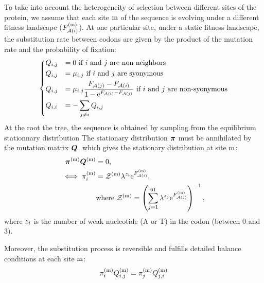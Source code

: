 To take into account the heterogeneity of selection between different sites of the protein, we assume that each site $\text{m}$ of the sequence is evolving under a different fitness landscape ($F_{\mathcal{A}({i})}^{(\text{m})}$).
At one particular site, under a static fitness landscape, the \gls{substitution} rate between \glspl{codon} are given by the product of the mutation rate and the probability of fixation:
\begin{equation}
    \begin{dcases}
        Q_{{i}, {j}} & = 0 \text{ if ${i}$ and ${j}$ are non neighbors} \\
        Q_{{i}, {j}} & = \mu_{{i}, {j}} \text{ if ${i}$ and ${j}$ are syonymous} \\
        Q_{{i}, {j}} & = \mu_{{i}, {j}} \dfrac{F_{\mathcal{A}({j})} - F_{\mathcal{A}({i})}}{1 - \mathrm{e}^{F_{\mathcal{A}({i})} - F_{\mathcal{A}({j})}} } \text{ if ${i}$ and ${j}$ are non-syonymous} \\
        Q_{{i}, {i}} & = - \sum\limits_{{j} \neq {i}} Q_{{i}, {j}}
    \end{dcases}
    \label{codonSubRates}
\end{equation}
At the root the tree, the sequence is obtained by sampling from the equilibrium stationnary distribution
The stationary distribution $\bm{\pi}$ must be annihilated by the mutation matrix $\bm{Q}$, which gives the stationary distribution at site $\text{m}$:
\begin{align}
    \bm{\pi}^{(\text{m})} \bm{Q}^{(\text{m})}
    & = 0 ,\\
    \iff \pi_{{i}}^{(\text{m})}
    & = \mathcal{Z}^{(\text{m})} \lambda^{{z}_{{i}}} \mathrm{e}^{F_{\mathcal{A}({i})}^{(\text{m})}},\\
    & \mathrm{ where } \ \mathcal{Z}^{(\text{m})} = \left( \sum\limits_{{j}=1}^{61} \lambda^{{z}_{{j}}} \mathrm{e}^{F_{\mathcal{A}({j})}^{(\text{m})}} \right)^{-1},
    \label{codonStationarity}
\end{align}
where ${z}_{{i}}$ is the number of weak nucleotide (A or T) in the \gls{codon} (between 0 and 3).

Moreover, the \gls{substitution} process is reversible and fulfills detailed balance conditions at each site $\text{m}$:
\begin{align}
    \pi_{{i}}^{(\text{m})} Q_{{i}, {j}}^{(\text{m})} = \pi_{{j}}^{(\text{m})} Q_{{j}, {i}}^{(\text{m})}
    \label{codonSubBalance}
\end{align}

